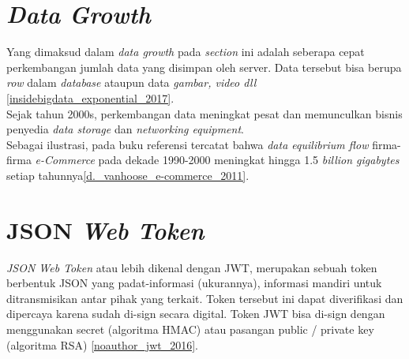 	\section{\textit{Data Growth}}
	Yang dimaksud dalam \textit{data growth} pada \textit{section} ini adalah seberapa cepat perkembangan jumlah data yang disimpan oleh server. Data tersebut bisa berupa \textit{row} dalam \textit{database} ataupun data \textit{gambar, video dll} \ref{insidebigdata_exponential_2017}.
	\\ \indent
	Sejak tahun 2000s, perkembangan data meningkat pesat dan memunculkan bisnis penyedia \textit{data storage} dan \textit{networking equipment}.
	\\ \indent Sebagai ilustrasi, pada buku referensi tercatat bahwa \textit{data equilibrium flow} firma-firma \textit{e-Commerce} pada dekade 1990-2000 meningkat hingga 1.5 \textit{billion gigabytes} setiap tahunnya\ref{d._vanhoose_e-commerce_2011}.
	
	
	\section{JSON \textit{Web Token}}
	\textit{JSON Web Token }atau lebih dikenal dengan JWT, merupakan sebuah token berbentuk JSON yang padat-informasi (ukurannya), informasi mandiri untuk ditransmisikan antar pihak yang terkait. Token tersebut ini dapat diverifikasi dan dipercaya karena sudah di-sign secara digital. Token JWT bisa di-sign dengan menggunakan secret (algoritma HMAC) atau pasangan public / private key (algoritma RSA) \ref{noauthor_jwt_2016}.
	
